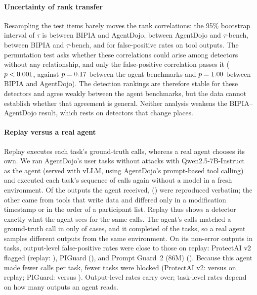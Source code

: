 \paragraph{Uncertainty of rank transfer}
Resampling the test items barely moves the rank correlations: the 95\% bootstrap interval of $\tau$ is \TauRankCI{} between BIPIA and AgentDojo, \TauADTBCI{} between AgentDojo and $\tau$-bench, \TauBITBCI{} between BIPIA and $\tau$-bench, and \TauFPRADTBCI{} for false-positive rates on tool outputs. The permutation test asks whether these correlations could arise among \NDetectors detectors without any relationship, and only the false-positive correlation passes it ($p<0.001$, against $p=0.17$ between the agent benchmarks and $p=1.00$ between BIPIA and AgentDojo). The detection rankings are therefore stable for these detectors and agree weakly between the agent benchmarks, but the data cannot establish whether that agreement is general. Neither analysis weakens the BIPIA--AgentDojo result, which rests on detectors that change places.

\paragraph{Replay versus a real agent}
Replay executes each task's ground-truth calls, whereas a real agent chooses its own. We ran AgentDojo's \EFiveTasks user tasks without attacks with Qwen2.5-7B-Instruct as the agent (served with vLLM, using AgentDojo's prompt-based tool calling) and executed each task's sequence of calls again without a model in a fresh environment. Of the \EFiveCalls outputs the agent received, \EFiveIdenticalN (\EFiveIdentical) were reproduced verbatim; the other \EFiveDiffN came from tools that write data and differed only in a modification timestamp or in the order of a participant list. Replay thus shows a detector exactly what the agent sees for the same calls. The agent's calls matched a ground-truth call in only \EFiveInGT of cases, and it completed \EFiveUtility of the tasks, so a real agent samples different outputs from the same environment. On its \EFiveObsOutputs non-error outputs in \EFiveObsTasks tasks, output-level false-positive rates were close to those on replay: ProtectAI v2 flagged \EFivePAObsFpr (replay: \EFivePARepFpr), PIGuard \EFivePGObsFpr (\EFivePGRepFpr), and Prompt Guard~2 (86M) \EFivePGtObsFpr (\EFivePGtRepFpr). Because this agent made fewer calls per task, fewer tasks were blocked (ProtectAI v2: \EFivePAObsBlock versus \EFivePARepBlock on replay; PIGuard: \EFivePGObsBlock versus \EFivePGRepBlock). Output-level rates carry over; task-level rates depend on how many outputs an agent reads.

